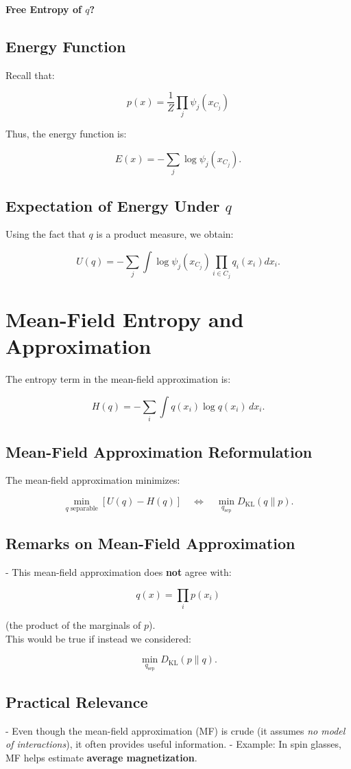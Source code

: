 \documentclass{article}%
\begin{document}
\textbf{Free Entropy of \( q \)?}

\subsection*{Energy Function}
Recall that:

\[
p(x) = \frac{1}{Z} \prod_j \psi_j(x_{C_j})
\]

Thus, the energy function is:

\[
E(x) = -\sum_j \log \psi_j(x_{C_j}).
\]

\subsection*{Expectation of Energy Under \( q \)}
Using the fact that \( q \) is a product measure, we obtain:

\[
U(q) = - \sum_j \int \log \psi_j(x_{C_j}) \prod_{i \in C_j} q_i(x_i) dx_i.
\]



\section*{Mean-Field Entropy and Approximation}

The entropy term in the mean-field approximation is:

\[
H(q) = - \sum_i \int q(x_i) \log q(x_i) \, dx_i.
\]

\subsection*{Mean-Field Approximation Reformulation}
The mean-field approximation minimizes:

\[
\min_{q \text{ separable}} \left[ U(q) - H(q) \right] \quad \Leftrightarrow \quad \min_{q_{\text{sep}}} D_{\text{KL}}(q \| p).
\]

\subsection*{Remarks on Mean-Field Approximation}
- This mean-field approximation does \textbf{not} agree with:

\[
q(x) = \prod_i p(x_i)
\]

(the product of the marginals of \( p \)). \\
This would be true if instead we considered:

\[
\min_{q_{\text{sep}}} D_{\text{KL}}(p \| q).
\]

\subsection*{Practical Relevance}
- Even though the mean-field approximation (MF) is crude (it assumes \textit{no model of interactions}), it often provides useful information.
- Example: In spin glasses, MF helps estimate \textbf{average magnetization}.
\end{document}
